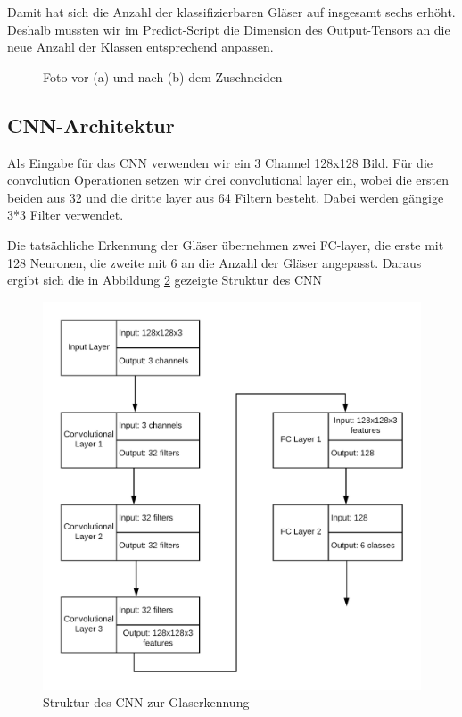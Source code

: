 Damit hat sich die Anzahl der klassifizierbaren Gläser auf insgesamt sechs erhöht. Deshalb mussten wir im Predict-Script die Dimension des Output-Tensors an die neue Anzahl der Klassen entsprechend anpassen.

\begin{figure}[!h]
	\centering
	\caption{Foto vor (a) und nach (b) dem Zuschneiden}
	\label{fig:vergleich_glas_zuschnitt}
\end{figure}
\clearpage

\subsection{\ac{CNN}-Architektur}
Als Eingabe für das \ac{CNN} verwenden wir ein 3 Channel 128x128 Bild. 
Für die convolution Operationen setzen wir drei convolutional layer ein, wobei die ersten beiden aus 32 und die dritte layer aus 64 Filtern besteht. 
Dabei werden gängige 3*3 Filter verwendet.

Die tatsächliche Erkennung der Gläser übernehmen zwei FC-layer, die erste mit 128 Neuronen, die zweite mit 6 an die Anzahl der Gläser angepasst. Daraus ergibt sich die in Abbildung \ref{fig:glass_structure} gezeigte Struktur des \ac{CNN}

\begin{figure}[!h]
	\centering
	\includegraphics[width=0.7\linewidth]{content/pictures/glass_structure}
	\caption{Struktur des \ac{CNN} zur Glaserkennung}
	\label{fig:glass_structure}
\end{figure}
